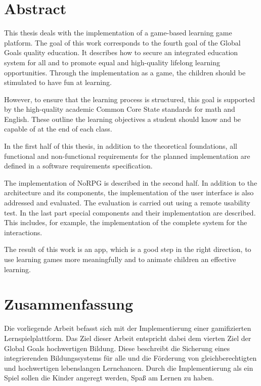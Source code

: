 
\chapter*{Abstract}
	This thesis deals with the implementation of a game-based learning game platform. The goal of this work corresponds to the fourth goal of the Global Goals quality education. It describes how to secure an integrated education system for all and to promote equal and high-quality lifelong learning opportunities. Through the implementation as a game, the children should be stimulated to have fun at learning.
	
	However, to ensure that the learning process is structured, this goal is supported by the high-quality academic Common Core State standards for math and English. These outline the learning objectives a student should know and be capable of at the end of each class.
	
	In the first half of this thesis, in addition to the theoretical foundations, all functional and non-functional requirements for the planned implementation are defined in a software requirements specification.
	
	The implementation of NoRPG is described in the second half. In addition to the architecture and its components, the implementation of the user interface is also addressed and evaluated. The evaluation is carried out using a remote usability test. In the last part special components and their implementation are described. This includes, for example, the implementation of the complete system for the interactions.
	
	The result of this work is an app, which is a good step in the right direction, to use learning games more meaningfully and to animate children an effective learning.
	
	
\pagebreak

\chapter*{Zusammenfassung}
	Die vorliegende Arbeit befasst sich mit der Implementierung einer gamifizierten Lernspielplattform. Das Ziel dieser Arbeit entspricht dabei dem vierten Ziel der Global Goals hochwertigen Bildung. Diese beschreibt die Sicherung eines integrierenden Bildungssystems für alle und die Förderung von gleichberechtigten und hochwertigen lebenslangen Lernchancen. Durch die Implementierung als ein Spiel sollen die Kinder angeregt werden, Spaß am Lernen zu haben.
	
